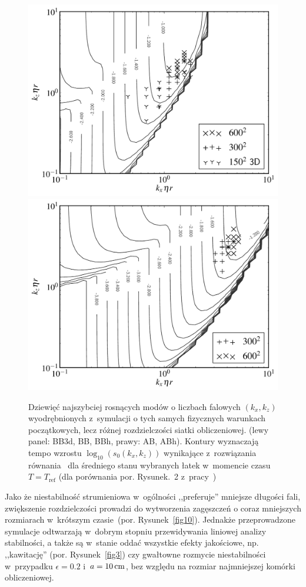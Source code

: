 \begin{figure}
  \includegraphics[width=0.48\linewidth]{figures/fig9a}
  \includegraphics[width=0.48\linewidth]{figures/fig9b}
  \caption{Dziewięć najszybciej rosnących modów o liczbach falowych $(k_x, k_z)$
     wyodrębnionych z~symulacji o tych samych fizycznych warunkach początkowych,
     lecz różnej rozdzielczości siatki obliczeniowej. (lewy panel: BB3d, BB,
     BBh, prawy: AB, ABh). Kontury wyznaczają tempo wzrostu $\log_{10}( s_0(k_x,
  k_z))$ wynikające z~rozwiązania równania~  dla średniego
  stanu wybranych łatek w~momencie czasu  $T = T_{\textrm{ref}}$ (dla porównania
  por. Rysunek.~2 z~pracy~\cite{YG05})}
   \label{fig9}
\end{figure}
%
\par Jako że niestabilność strumieniowa w~ogólności ,,preferuje'' mniejsze
długości fali, zwiększenie rozdzielczości prowadzi do wytworzenia
 zagęszczeń o coraz mniejszych rozmiarach w~krótszym czasie~(por.
Rysunek~\ref{fig10}).  Jednakże przeprowadzone symulacje odtwarzają w~dobrym
stopniu przewidywania liniowej analizy stabilności, a także są w~stanie oddać
wszystkie efekty jakościowe, np. ,,kawitację'' (por. Rysunek~\ref{fig3}) czy
gwałtowne rozmycie niestabilności w~przypadku $\epsilon=0.2$ i~$a=10\hbox{$\thinspace\textrm{cm}$}$, bez
względu na rozmiar najmniejszej komórki obliczeniowej.


